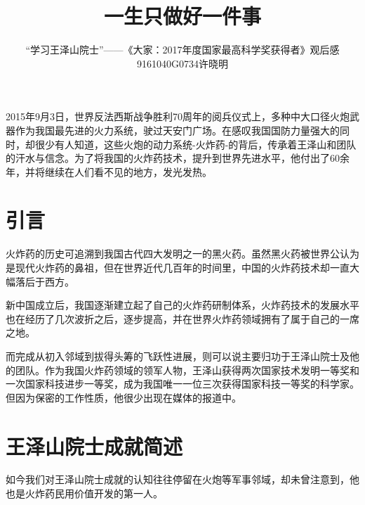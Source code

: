 \documentclass[12pt]{article}%
\title{一生只做好一件事}
\author{“学习王泽山院士”——《大家：2017年度国家最高科学奖获得者》观后感 \\9161040G0734许晓明 }
\date{}
\begin{document}

\renewcommand{\contentsname}{\centering 目录}
\renewcommand{\tablename}{表}
\renewcommand{\figurename}{图}
\renewcommand\refname{参考文献}
\renewcommand\appendix{\setcounter{secnumdepth}{0}}
\renewcommand\abstractname{摘要}



\maketitle

\large\tableofcontents
\newpage
\large 2015年9月3日，世界反法西斯战争胜利70周年的阅兵仪式上，多种中大口径火炮武器作为我国最先进的火力系统，驶过天安门广场。在感叹我国国防力量强大的同时，却很少有人知道，这些火炮的动力系统-火炸药-的背后，传承着王泽山和团队的汗水与信念。为了将我国的火炸药技术，提升到世界先进水平，他付出了60余年，并将继续在人们看不见的地方，发光发热。
\appendix
\section{引言}
火炸药的历史可追溯到我国古代四大发明之一的黑火药。虽然黑火药被世界公认为是现代火炸药的鼻祖，但在世界近代几百年的时间里，中国的火炸药技术却一直大幅落后于西方。

新中国成立后，我国逐渐建立起了自己的火炸药研制体系，火炸药技术的发展水平也在经历了几次波折之后，逐步提高，并在世界火炸药领域拥有了属于自己的一席之地。

而完成从初入邻域到拔得头筹的飞跃性进展，则可以说主要归功于王泽山院士及他的团队。作为我国火炸药领域的领军人物，王泽山获得两次国家技术发明一等奖和一次国家科技进步一等奖，成为我国唯一一位三次获得国家科技一等奖的科学家。但因为保密的工作性质，他很少出现在媒体的报道中。
\section{王泽山院士成就简述}
如今我们对王泽山院士成就的认知往往停留在火炮等军事邻域，却未曾注意到，他也是火炸药民用价值开发的第一人。
\end{document}
